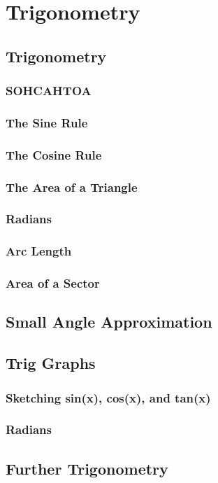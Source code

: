 \documentclass[../alevelmaths.tex]{subfiles}
\begin{document}
\chapter{Trigonometry}
\section{Trigonometry}
\subsection*{SOHCAHTOA}
\subsection*{The Sine Rule}
\subsection*{The Cosine Rule}
\subsection*{The Area of a Triangle}
\subsection*{Radians}
\subsection*{Arc Length}
\subsection*{Area of a Sector}
\section{Small Angle Approximation}
\section{Trig Graphs}
\subsection*{Sketching sin(x), cos(x), and tan(x)}
\subsection*{Radians}
\section{Further Trigonometry}
\end{document}
